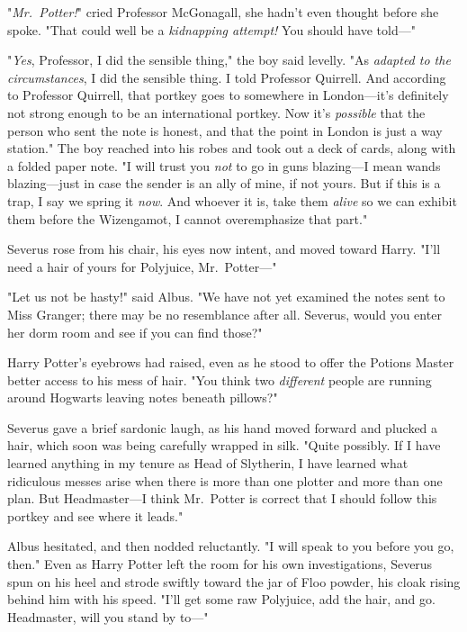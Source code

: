 "\emph{Mr.~Potter!}" cried Professor McGonagall, she hadn't even thought before 
she spoke. "That could well be a \emph{kidnapping attempt!} You should have 
told---"

"\emph{Yes}, Professor, I did the sensible thing," the boy said levelly. "As 
\emph{adapted to the circumstances}, I did the sensible thing. I told Professor 
Quirrell. And according to Professor Quirrell, that portkey goes to somewhere 
in London---it's definitely not strong enough to be an international portkey. 
Now it's \emph{possible} that the person who sent the note is honest, and that 
the point in London is just a way station." The boy reached into his robes and 
took out a deck of cards, along with a folded paper note. "I will trust you 
\emph{not} to go in guns blazing---I mean wands blazing---just in case the 
sender is an ally of mine, if not yours. But if this is a trap, I say we spring 
it \emph{now}. And whoever it is, take them \emph{alive} so we can exhibit them 
before the Wizengamot, I cannot overemphasize that part."

Severus rose from his chair, his eyes now intent, and moved toward Harry. "I'll 
need a hair of yours for Polyjuice, Mr.~Potter---"

"Let us not be hasty!" said Albus. "We have not yet examined the notes sent to 
Miss Granger; there may be no resemblance after all. Severus, would you enter 
her dorm room and see if you can find those?"

Harry Potter's eyebrows had raised, even as he stood to offer the Potions 
Master better access to his mess of hair. "You think two \emph{different} 
people are running around Hogwarts leaving notes beneath pillows?"

Severus gave a brief sardonic laugh, as his hand moved forward and plucked a 
hair, which soon was being carefully wrapped in silk. "Quite possibly. If I 
have learned anything in my tenure as Head of Slytherin, I have learned what 
ridiculous messes arise when there is more than one plotter and more than one 
plan. But Headmaster---I think Mr.~Potter is correct that I should follow this 
portkey and see where it leads."

Albus hesitated, and then nodded reluctantly. "I will speak to you before you 
go, then."
\sbreak
Even as Harry Potter left the room for his own investigations, Severus spun on 
his heel and strode swiftly toward the jar of Floo powder, his cloak rising 
behind him with his speed. "I'll get some raw Polyjuice, add the hair, and go. 
Headmaster, will you stand by to---"

